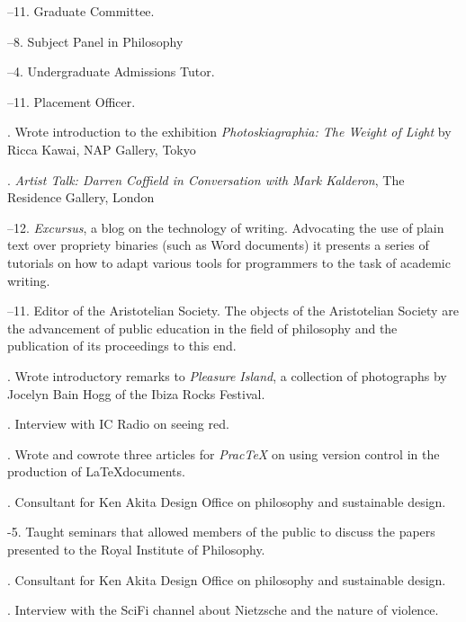 \documentclass[11pt]{article}
\begin{document}
--11. Graduate Committee.

--8. Subject Panel in Philosophy

--4. Undergraduate Admissions Tutor.

--11. Placement Officer.

\bigskip

\medskip

. Wrote introduction to the exhibition \emph{Photoskiagraphia: The Weight of Light} by Ricca Kawai, NAP Gallery, Tokyo

. \emph{Artist Talk: Darren Coffield in Conversation with Mark Kalderon}, The Residence Gallery, London

--12. \emph{Excursus}, a blog on the technology of writing. Advocating the use of plain text over propriety binaries (such as Word documents) it presents a series of tutorials on how to adapt various tools for programmers to the task of academic writing.

--11. Editor of the Aristotelian Society. The objects of the Aristotelian Society are the advancement of public education in the field of philosophy and the publication of its proceedings to this end. 

. Wrote introductory remarks to \emph{Pleasure Island}, a collection of photographs by Jocelyn Bain Hogg of the Ibiza Rocks Festival.

. Interview with IC Radio on seeing red.

. Wrote and cowrote three articles for \emph{PracTeX} on using version control in the production of \LaTeX documents.

. Consultant for Ken Akita Design Office on philosophy and sustainable design.

-5. Taught seminars that allowed members of the public to discuss the papers presented to the Royal Institute of Philosophy.

. Consultant for Ken Akita Design Office on philosophy and sustainable design.

. Interview with the SciFi channel about Nietzsche and the nature of violence.

\bigskip

\medskip
\end{document}
